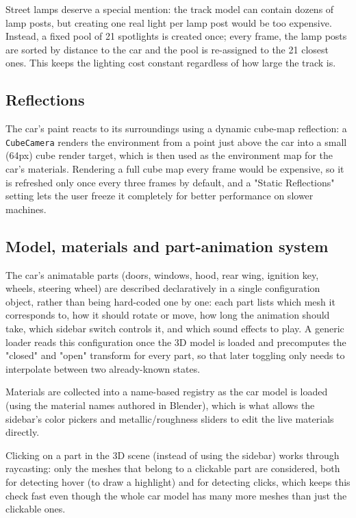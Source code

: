 \documentclass[11pt]{article}
\begin{document}
Street lamps deserve a special mention: the track model can contain dozens
of lamp posts, but creating one real light per lamp post would be too
expensive. Instead, a fixed pool of 21 spotlights is created once; every
frame, the lamp posts are sorted by distance to the car and the pool is
re-assigned to the 21 closest ones. This keeps the lighting cost constant
regardless of how large the track is.

\subsection{Reflections}
The car's paint reacts to its surroundings using a dynamic cube-map
reflection: a \texttt{CubeCamera} renders the environment from a point just
above the car into a small (64px) cube render target, which is then used as
the environment map for the car's materials. Rendering a full cube map
every frame would be expensive, so it is refreshed only once every three
frames by default, and a "Static Reflections" setting lets the user freeze
it completely for better performance on slower machines.

\subsection{Model, materials and part-animation system}
The car's animatable parts (doors, windows, hood, rear wing, ignition key,
wheels, steering wheel) are described declaratively in a single
configuration object, rather than being hard-coded one by one: each part
lists which mesh it corresponds to, how it should rotate or move, how long
the animation should take, which sidebar switch controls it, and which
sound effects to play. A generic loader reads this configuration once the
3D model is loaded and precomputes the "closed" and "open" transform for
every part, so that later toggling only needs to interpolate between two
already-known states.

Materials are collected into a name-based registry as the car model is
loaded (using the material names authored in Blender), which is what
allows the sidebar's color pickers and metallic/roughness sliders to edit
the live materials directly.

Clicking on a part in the 3D scene (instead of using the sidebar) works
through raycasting: only the meshes that belong to a clickable part are
considered, both for detecting hover (to draw a highlight) and for
detecting clicks, which keeps this check fast even though the whole car
model has many more meshes than just the clickable ones.
\end{document}
